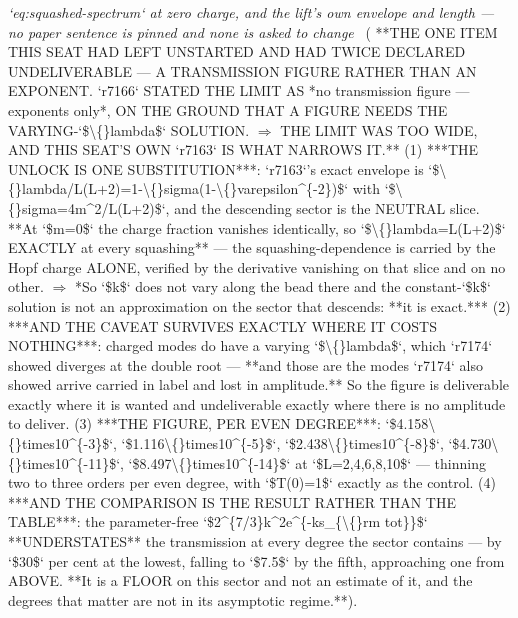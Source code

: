 \begin{description}
\textit{`eq:squashed-spectrum` at zero charge, and the lift's own envelope and length --- no paper sentence is pinned and none is asked to change} \ ( **THE ONE ITEM THIS SEAT HAD LEFT UNSTARTED AND HAD TWICE DECLARED UNDELIVERABLE --- A TRANSMISSION FIGURE RATHER THAN AN EXPONENT. `r7166` STATED THE LIMIT AS *no transmission figure --- exponents only*, ON THE GROUND THAT A FIGURE NEEDS THE VARYING-`\$\textbackslash\{\}lambda\$` SOLUTION. \ensuremath{\Rightarrow} THE LIMIT WAS TOO WIDE, AND THIS SEAT'S OWN `r7163` IS WHAT NARROWS IT.** (1) ***THE UNLOCK IS ONE SUBSTITUTION***: `r7163`'s exact envelope is `\$\textbackslash\{\}lambda/L(L+2)=1-\textbackslash\{\}sigma(1-\textbackslash\{\}varepsilon\textasciicircum{}\{-2\})\$` with `\$\textbackslash\{\}sigma=4m\textasciicircum{}2/L(L+2)\$`, and the descending sector is the NEUTRAL slice. **At `\$m=0\$` the charge fraction vanishes identically, so `\$\textbackslash\{\}lambda=L(L+2)\$` EXACTLY at every squashing** --- the squashing-dependence is carried by the Hopf charge ALONE, verified by the derivative vanishing on that slice and on no other. \ensuremath{\Rightarrow} *So `\$k\$` does not vary along the bead there and the constant-`\$k\$` solution is not an approximation on the sector that descends: **it is exact.*** (2) ***AND THE CAVEAT SURVIVES EXACTLY WHERE IT COSTS NOTHING***: charged modes do have a varying `\$\textbackslash\{\}lambda\$`, which `r7174` showed diverges at the double root --- **and those are the modes `r7174` also showed arrive carried in label and lost in amplitude.** So the figure is deliverable exactly where it is wanted and undeliverable exactly where there is no amplitude to deliver. (3) ***THE FIGURE, PER EVEN DEGREE***: `\$4.158\textbackslash\{\}times10\textasciicircum{}\{-3\}\$`, `\$1.116\textbackslash\{\}times10\textasciicircum{}\{-5\}\$`, `\$2.438\textbackslash\{\}times10\textasciicircum{}\{-8\}\$`, `\$4.730\textbackslash\{\}times10\textasciicircum{}\{-11\}\$`, `\$8.497\textbackslash\{\}times10\textasciicircum{}\{-14\}\$` at `\$L=2,4,6,8,10\$` --- thinning two to three orders per even degree, with `\$T(0)=1\$` exactly as the control. (4) ***AND THE COMPARISON IS THE RESULT RATHER THAN THE TABLE***: the parameter-free `\$2\textasciicircum{}\{7/3\}k\textasciicircum{}2e\textasciicircum{}\{-ks\_\{\textbackslash\{\}rm tot\}\}\$` **UNDERSTATES** the transmission at every degree the sector contains --- by `\$30\$` per cent at the lowest, falling to `\$7.5\$` by the fifth, approaching one from ABOVE. **It is a FLOOR on this sector and not an estimate of it, and the degrees that matter are not in its asymptotic regime.**). 

\end{description}
